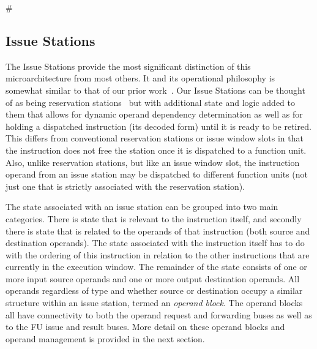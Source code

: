 #\documentclass[10pt,dvips]{article}
\begin{document}
\subsection{Issue Stations}
%
The Issue Stations provide the most significant distinction of this
microarchitecture from most others.  It and its operational philosophy
is somewhat similar to that of our prior work~\cite{undisclosed1}.
Our Issue Stations can be thought of as being 
reservation stations~\cite{Anderson67,Tom67}
but with additional state and logic added to them that allows
for dynamic operand dependency determination as well as
for holding a dispatched instruction (its decoded form) 
until it is ready to be
retired.  This differs from conventional reservation stations
or issue window slots in that the instruction does not free
the station once it is dispatched to a function unit.
Also, unlike reservation stations, but like an issue window slot,
the instruction operand from an issue station may be dispatched
to different function units (not just one that is strictly
associated with the reservation station).

The state associated with an issue station can be grouped into
two main categories.  There is state that is relevant to
the instruction itself, and secondly there is state that is
related to the operands of that instruction (both source and
destination operands).
The state associated with the instruction itself has to do
with the ordering of this instruction in relation to the other
instructions that are currently in the execution window.
The remainder of the state consists of one or more input
source operands and one or more output destination operands.
All operands regardless of type and whether source or destination
occupy a similar structure within an issue station, termed an
\textit{operand block}.
The operand blocks all have connectivity to both the
operand request and forwarding buses as well as to the FU
issue and result buses.
More detail on these operand blocks and operand management
is provided in the next section.
\end{document}
